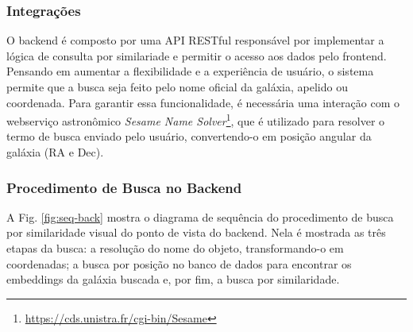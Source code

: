 



\subsubsection{Integrações}
\label{sec:si-back-arch}

O backend é composto por uma API RESTful responsável por implementar a lógica de consulta por similariade e permitir o acesso aos dados pelo frontend. Pensando em aumentar a flexibilidade e a experiência de usuário, o sistema permite que a busca seja feito pelo nome oficial da galáxia, apelido ou coordenada. Para garantir essa funcionalidade, é necessária uma interação com o webserviço astronômico \emph{Sesame Name Solver}\footnote{\url{https://cds.unistra.fr/cgi-bin/Sesame}}, que é utilizado para resolver o termo de busca enviado pelo usuário, convertendo-o em posição angular da galáxia (RA e Dec).









\subsubsection{Procedimento de Busca no Backend}
\label{sec:si-bacak-busca}

A Fig. \ref{fig:seq-back} mostra o diagrama de sequência do procedimento de busca por similaridade visual do ponto de vista do backend. Nela é mostrada as três etapas da busca: a resolução do nome do objeto, transformando-o em coordenadas; a busca por posição no banco de dados para encontrar os embeddings da galáxia buscada e, por fim, a busca por similaridade.

